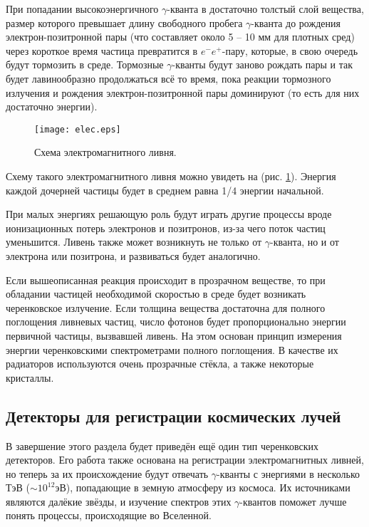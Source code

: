 \begin{Diplom-Main}
	При попадании высокоэнергичного $ \gamma $-кванта в достаточно толстый слой вещества, размер которого превышает длину свободного пробега $ \gamma $-кванта до рождения электрон-позитронной пары (что составляет около 5 -- 10 мм для плотных сред) через короткое время частица превратится в $e^-e^+$-пару, которые, в свою очередь будут тормозить в среде. 
	Тормозные $\gamma$-кванты будут заново рождать пары и так будет лавинообразно продолжаться всё то время, пока реакции тормозного излучения и рождения электрон-позитронной пары доминируют (то есть для них достаточно энергии).
	\begin{figure}
		\noindent
		\hfil
		\texttt{[image: elec.eps]}
		\hfil
		\caption{Схема электромагнитного ливня.}
		\label{emrain}
	\end{figure}
	
	Схему такого электромагнитного ливня можно увидеть на (рис. \ref{emrain}).
	Энергия каждой дочерней частицы будет в среднем равна 1/4 энергии начальной.
	
	При малых энергиях решающую роль будут играть другие процессы вроде ионизационных потерь электронов и позитронов, из-за чего поток частиц уменьшится.
	Ливень также может возникнуть не только от $ \gamma $-кванта, но и от электрона или позитрона, и развиваться будет аналогично.
	
	Если вышеописанная реакция происходит в прозрачном веществе, то при обладании частицей необходимой скоростью в среде будет возникать черенковское излучение. 
	Если толщина вещества достаточна для полного поглощения ливневых частиц, число фотонов будет пропорционально энергии первичной частицы, вызвавшей ливень. 
	На этом основан принцип измерения энергии черенковскими спектрометрами полного поглощения. 
	В качестве их радиаторов используются очень прозрачные стёкла, а также некоторые кристаллы. 
	\subsection{Детекторы для регистрации космических лучей}
	\label{sec:subsection}
	
	В завершение этого раздела будет приведён ещё один тип черенковских детекторов.
	Его работа также основана на регистрации электромагнитных ливней, но теперь за их происхождение будут отвечать $ \gamma $-кванты с энергиями в несколько ТэВ ($ \sim10^{12}  $эВ), попадающие в земную атмосферу из космоса.
	Их источниками являются далёкие звёзды, и изучение спектров этих $ \gamma $-квантов поможет лучше понять процессы, происходящие во Вселенной.
	

\end{Diplom-Main}
